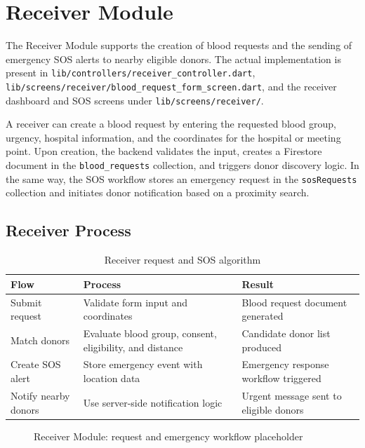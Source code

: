 \section{Receiver Module}

The Receiver Module supports the creation of blood requests and the sending of emergency SOS alerts to nearby eligible donors. The actual implementation is present in \texttt{lib/controllers/receiver_controller.dart}, \texttt{lib/screens/receiver/blood_request_form_screen.dart}, and the receiver dashboard and SOS screens under \texttt{lib/screens/receiver/}.

A receiver can create a blood request by entering the requested blood group, urgency, hospital information, and the coordinates for the hospital or meeting point. Upon creation, the backend validates the input, creates a Firestore document in the \texttt{blood_requests} collection, and triggers donor discovery logic. In the same way, the SOS workflow stores an emergency request in the \texttt{sosRequests} collection and initiates donor notification based on a proximity search.

\subsection{Receiver Process}

\begin{table}[H]
\centering
\caption{Receiver request and SOS algorithm}
\begin{tabularx}{\textwidth}{|p{4.2cm}|X|p{4.0cm}|}
\hline
\textbf{Flow} & \textbf{Process} & \textbf{Result} \\
\hline
Submit request & Validate form input and coordinates & Blood request document generated \\
\hline
Match donors & Evaluate blood group, consent, eligibility, and distance & Candidate donor list produced \\
\hline
Create SOS alert & Store emergency event with location data & Emergency response workflow triggered \\
\hline
Notify nearby donors & Use server-side notification logic & Urgent message sent to eligible donors \\
\hline
\end{tabularx}
\end{table}

\begin{figure}[H]
\centering
{}
\caption{Receiver Module: request and emergency workflow placeholder}
\end{figure}

